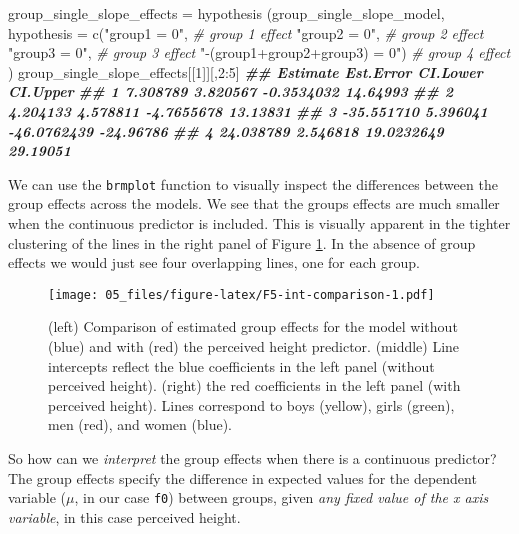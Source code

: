 \documentclass[
]{book}
\newenvironment{Shaded}{\begin{snugshade}}{\end{snugshade}}
\newcommand{\AttributeTok}[1]{\textcolor[rgb]{0.77,0.63,0.00}{#1}}
\newcommand{\CommentTok}[1]{\textcolor[rgb]{0.56,0.35,0.01}{\textit{#1}}}
\newcommand{\DecValTok}[1]{\textcolor[rgb]{0.00,0.00,0.81}{#1}}
\newcommand{\DocumentationTok}[1]{\textcolor[rgb]{0.56,0.35,0.01}{\textbf{\textit{#1}}}}
\newcommand{\FunctionTok}[1]{\textcolor[rgb]{0.00,0.00,0.00}{#1}}
\newcommand{\NormalTok}[1]{#1}
\newcommand{\OtherTok}[1]{\textcolor[rgb]{0.56,0.35,0.01}{#1}}
\newcommand{\SpecialCharTok}[1]{\textcolor[rgb]{0.00,0.00,0.00}{#1}}
\newcommand{\StringTok}[1]{\textcolor[rgb]{0.31,0.60,0.02}{#1}}
\begin{document}
\begin{Shaded}
\begin{Highlighting}[]

\NormalTok{group\_single\_slope\_effects }\OtherTok{=} 
  \FunctionTok{hypothesis}\NormalTok{ (group\_single\_slope\_model,}
              \AttributeTok{hypothesis =} \FunctionTok{c}\NormalTok{(}\StringTok{"group1 = 0"}\NormalTok{, }\CommentTok{\# group 1 effect}
                             \StringTok{"group2 = 0"}\NormalTok{, }\CommentTok{\# group 2 effect }
                             \StringTok{"group3 = 0"}\NormalTok{, }\CommentTok{\# group 3 effect}
                             \StringTok{"{-}(group1+group2+group3) = 0"}\NormalTok{) }\CommentTok{\# group 4 effect}
\NormalTok{)   }
\NormalTok{group\_single\_slope\_effects[[}\DecValTok{1}\NormalTok{]][,}\DecValTok{2}\SpecialCharTok{:}\DecValTok{5}\NormalTok{]}
\DocumentationTok{\#\#     Estimate Est.Error    CI.Lower  CI.Upper}
\DocumentationTok{\#\# 1   7.308789  3.820567  {-}0.3534032  14.64993}
\DocumentationTok{\#\# 2   4.204133  4.578811  {-}4.7655678  13.13831}
\DocumentationTok{\#\# 3 {-}35.551710  5.396041 {-}46.0762439 {-}24.96786}
\DocumentationTok{\#\# 4  24.038789  2.546818  19.0232649  29.19051}
\end{Highlighting}
\end{Shaded}

We can use the \texttt{brmplot} function to visually inspect the differences between the group effects across the models. We see that the groups effects are much smaller when the continuous predictor is included. This is visually apparent in the tighter clustering of the lines in the right panel of Figure \ref{fig:F5-int-comparison}. In the absence of group effects we would just see four overlapping lines, one for each group.

\begin{figure}
\centering
\texttt{[image: 05\_files/figure-latex/F5-int-comparison-1.pdf]}
\caption{\label{fig:F5-int-comparison} (left) Comparison of estimated group effects for the model without (blue) and with (red) the perceived height predictor. (middle) Line intercepts reflect the blue coefficients in the left panel (without perceived height). (right) the red coefficients in the left panel (with perceived height). Lines correspond to boys (yellow), girls (green), men (red), and women (blue).}
\end{figure}

So how can we \emph{interpret} the group effects when there is a continuous predictor? The group effects specify the difference in expected values for the dependent variable (\(\mu\), in our case \texttt{f0}) between groups, given \emph{any fixed value of the x axis variable}, in this case perceived height.
\end{document}
